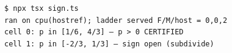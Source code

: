 \begin{Verbatim}[fontsize=\small,frame=leftline,rulecolor=\color{accentmid},framesep=3mm,xleftmargin=3mm]
$ npx tsx sign.ts
ran on cpu(hostref); ladder served F/M/host = 0,0,2
cell 0: p in [1/6, 4/3] — p > 0 CERTIFIED
cell 1: p in [-2/3, 1/3] — sign open (subdivide)
\end{Verbatim}
